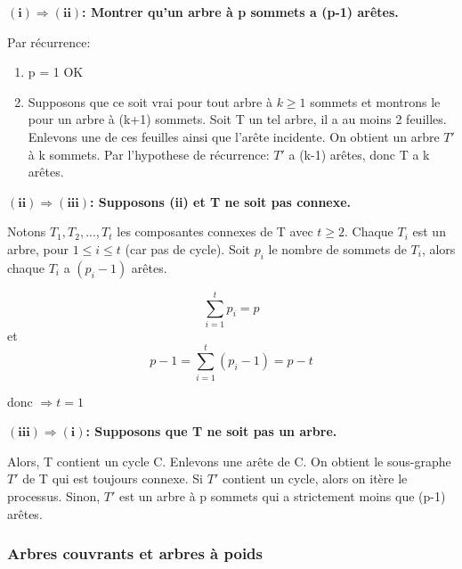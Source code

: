 \begin{demo}

$\mathbf{(i) \Rightarrow (ii)}$\textbf{: Montrer qu'un arbre à p sommets a (p-1) arêtes.}

	Par récurrence:
		\begin{enumerate}
			\item p = 1 OK 
			\item Supposons que ce soit vrai pour tout arbre à $ k \geq 1$ sommets et montrons le pour un arbre à (k+1) sommets. Soit T un tel arbre, il a au moins 2 feuilles. Enlevons une de ces feuilles ainsi que l'arête incidente. On obtient un arbre ${T}'$ à k sommets. Par l'hypothese de récurrence: ${T}'$ a (k-1) arêtes, donc T a k arêtes.
		\end{enumerate} 

\hspace{-0.5cm}$\mathbf{(ii) \Rightarrow (iii)}$\textbf{: Supposons (ii) et T ne soit pas connexe.}

	Notons $T_{1}, T_{2},...,T_{t}$ les composantes connexes de T avec $t \geq 2$. Chaque $T_{i}$ est un arbre, pour $1 \leq i \leq t$ (car pas de cycle). Soit $p_{i}$ le nombre de sommets de $T_{i}$, alors chaque $T_{i}$ a $(p_{i}-1)$ arêtes.\\

	\begin{minipage}{.5\textwidth}
		$$\sum_{i=1}^{t} p_{i} = p$$ et $$p-1 = \sum_{i=1}^{t} (p_{i}-1) = p - t $$ 
	\end{minipage}
	\begin{minipage}{.5\textwidth}
		donc $\Rightarrow t = 1 $
	\end{minipage}

\hspace{-0.5cm}$\mathbf{(iii) \Rightarrow (i)}$\textbf{: Supposons que T ne soit pas un arbre.}

	Alors, T contient un cycle C. Enlevons une arête de C. On obtient le sous-graphe ${T}'$ de T qui est toujours connexe. Si ${T}'$ contient un cycle, alors on itère le processus. Sinon, ${T}'$ est un arbre à p sommets qui a strictement moins que (p-1) arêtes.
		
\end{demo}


\subsubsection{Arbres couvrants et arbres à poids}


